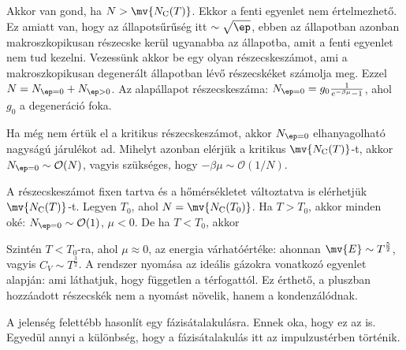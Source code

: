    Akkor van gond, ha $N>\mv{N_\text{C}(T)}$.
   Ekkor a fenti egyenlet nem értelmezhető.
   Ez amiatt van, hogy az állapotsűrűség itt $\sim\sqrt{\ep}$, ebben az állapotban azonban makroszkopikusan részecske kerül ugyanabba az állapotba, amit a fenti egyenlet nem tud kezelni.
   Vezessünk akkor be egy olyan részecskeszámot, ami a makroszkopikusan degenerált állapotban lévő részecskéket számolja meg.
   Ezzel $N=N_{\ep=0}+N_{\ep>0}$.
   Az alapállapot részecskeszáma: $N_{\ep=0}=g_0\frac{1}{e^{-\beta\mu}-1}$, ahol $g_0$ a degeneráció foka. 
   
   Ha még nem értük el a kritikus részecskeszámot, akkor $N_{\ep=0}$ elhanyagolható nagyságú járulékot ad.
   Mihelyt azonban elérjük a kritikus $\mv{N_\text{C}(T)}$-t, akkor $N_{\ep=0}\sim\mathcal{O}(N)$, vagyis szükséges, hogy $-\beta\mu\sim\mathcal{O}(1/N)$. 
   
   A részecskeszámot fixen tartva és a hőmérsékletet változtatva is elérhetjük $\mv{N_\text{C}(T)}$-t.
   Legyen $T_0$, ahol $N=\mv{N_\text{C}(T_0)}$.
   Ha $T>T_0$, akkor minden oké: $N_{\ep=0}\sim\mathcal{O}(1)$, $\mu<0$.
   De ha $T<T_0$, akkor 
   
   Szintén $T<T_0$-ra, ahol $\mu\approx 0$, az energia várhatóértéke:
   ahonnan $\mv{E}\sim T^{\frac{5}{2}}$, vagyis $C_V\sim T^{\frac{3}{2}}$.
   A rendszer nyomása az ideális gázokra vonatkozó  egyenlet alapján:
   ami láthatjuk, hogy független a térfogattól.
   Ez érthető, a pluszban hozzáadott részecskék nem a nyomást növelik, hanem a kondenzálódnak. 
   
   A jelenség felettébb hasonlít egy fázisátalakulásra.
   Ennek oka, hogy ez az is.
   Egyedül annyi a különbség, hogy a fázisátalakulás itt az impulzustérben történik.

